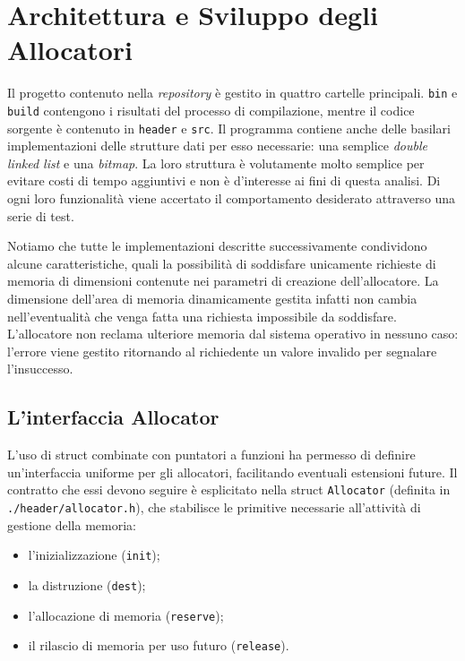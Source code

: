 \chapter{Architettura e Sviluppo degli Allocatori}
Il progetto contenuto nella \textit{repository} è gestito in quattro cartelle principali. \texttt{bin} e \texttt{build} contengono i risultati del processo di compilazione, mentre il codice sorgente è contenuto in \texttt{header} e \texttt{src}. Il programma contiene anche delle basilari implementazioni delle strutture dati per esso necessarie: una semplice \textit{double linked list} e una \textit{bitmap}. La loro struttura è volutamente molto semplice per evitare costi di tempo aggiuntivi e non è d’interesse ai fini di questa analisi. Di ogni loro funzionalità viene accertato il comportamento desiderato attraverso una serie di test.

Notiamo che tutte le implementazioni descritte successivamente condividono alcune caratteristiche, quali la possibilità di soddisfare unicamente richieste di memoria di dimensioni contenute nei parametri di creazione dell'allocatore. La dimensione dell’area di memoria dinamicamente gestita infatti non cambia nell’eventualità che venga fatta una richiesta impossibile da soddisfare. L’allocatore non reclama ulteriore memoria dal sistema operativo in nessuno caso: l’errore viene gestito ritornando al richiedente un valore invalido per segnalare l’insuccesso. 

\section{L’interfaccia Allocator}
L’uso di struct combinate con puntatori a funzioni ha permesso di definire un’interfaccia uniforme per gli allocatori, facilitando eventuali estensioni future. Il contratto che essi devono seguire è esplicitato nella struct \texttt{Allocator} (definita in \texttt{./header/allocator.h}), che stabilisce le primitive necessarie all'attività di gestione della memoria:

\begin{itemize}
    \item l’inizializzazione (\texttt{init});
    \item la distruzione (\texttt{dest});
    \item l’allocazione di memoria (\texttt{reserve});
    \item il rilascio di memoria per uso futuro (\texttt{release}).
\end{itemize}

